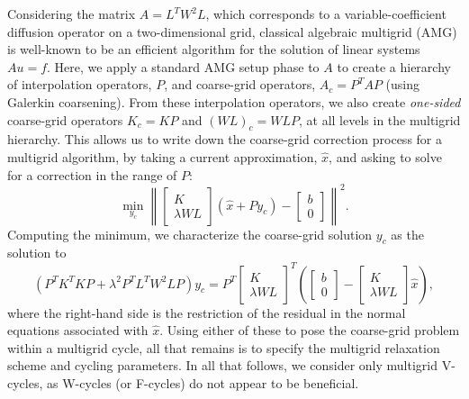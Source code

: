 \documentclass{article}
\begin{document}
Considering the matrix $A = L^TW^2L$, which corresponds to a
variable-coefficient diffusion operator on a two-dimensional grid,
classical algebraic multigrid (AMG) is well-known to be an efficient
algorithm for the solution of linear systems $Au=f$.  Here, we apply a
standard AMG setup phase to $A$ to create a hierarchy of interpolation
operators, $P$, and coarse-grid operators, $A_c = P^TAP$ (using
Galerkin coarsening).  From these interpolation operators, we also
create {\it one-sided} coarse-grid operators $K_c = KP$ and $(WL)_c =
WLP$, at all levels in the multigrid hierarchy.  This allows us to
write down the coarse-grid correction process for a multigrid
algorithm, by taking a current approximation, $\hat{x}$, and asking to
solve for a correction in the range of $P$:
\[
\min_{y_c}\left\| \left[\begin{array}{c} K \\ \lambda
      WL\end{array}\right](\hat{x}+Py_c) - \left[\begin{array}{c} b \\ 0 \end{array}\right]\right\|^2.
\]
Computing the minimum, we characterize the coarse-grid solution $y_c$
as the solution to
\[
\left(P^TK^TKP + \lambda^2P^TL^TW^2LP\right)y_c =
P^T\left[\begin{array}{c} K \\ \lambda WL\end{array}\right]^T
\left(\left[\begin{array}{c} b \\ 0 \end{array}\right] - \left[\begin{array}{c} K \\ \lambda
      WL\end{array}\right]\hat{x}\right),
\]
where the right-hand side is the restriction of the residual in the
normal equations associated with $\hat{x}$.  Using either of these to
pose the coarse-grid problem within a multigrid cycle, all that
remains is to specify the multigrid relaxation scheme and cycling
parameters.  In all that follows, we consider only multigrid V-cycles,
as W-cycles (or F-cycles) do not appear to be beneficial.
\end{document}
